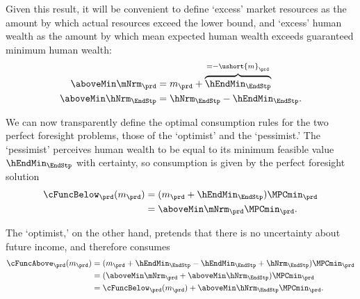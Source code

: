   Given this result, it will be convenient to define `excess' market
  resources as the amount by which actual resources exceed the lower
  bound, and `excess' human wealth as the amount by which mean expected human wealth
  exceeds guaranteed minimum human wealth:
  \begin{equation*}\begin{gathered}\begin{aligned}
        \aboveMin \mNrm_{\prd}  & = {m}_{\prd}+\overbrace{\hEndMin_{\EndStp}}^{=-\ushort{m}_{\prd}}
        \\  \aboveMin \hNrm_{\EndStp}  & = \hNrm_{\EndStp}-\hEndMin_{\EndStp}.
      \end{aligned}\end{gathered}\end{equation*}

  We can now transparently define the optimal
  consumption rules for the two perfect foresight problems, those of the
  `optimist' and the `pessimist.'  The `pessimist' perceives human
  wealth to be equal to its minimum feasible value $\hEndMin_{\EndStp}$ with certainty, so
  consumption is given by the perfect foresight solution
  \begin{equation*}\begin{gathered}\begin{aligned}
        \cFuncBelow_{\prd}(m_{\prd})  & = ({m}_{\prd}+\hEndMin_{\EndStp})\MPCmin_{\prd}
        \\  & = \aboveMin \mNrm_{\prd}\MPCmin_{\prd}
        .
      \end{aligned}\end{gathered}\end{equation*}

  The `optimist,' on the other hand, pretends that there is no uncertainty
  about future income, and therefore consumes
  \begin{equation*}\begin{gathered}\begin{aligned}
        \cFuncAbove_{\prd}(m_{\prd})  & = ({m}_{\prd} +\hEndMin_{\EndStp} - \hEndMin_{\EndStp} + \hNrm_{\EndStp} )\MPCmin_{\prd}
        \\    & = (\aboveMin \mNrm_{\prd} + \aboveMin \hNrm_{\EndStp})\MPCmin_{\prd}
        \\      & = \cFuncBelow_{\prd}(m_{\prd})+\aboveMin \hNrm_{\EndStp} \MPCmin_{\prd}
        .
      \end{aligned}\end{gathered}\end{equation*}

